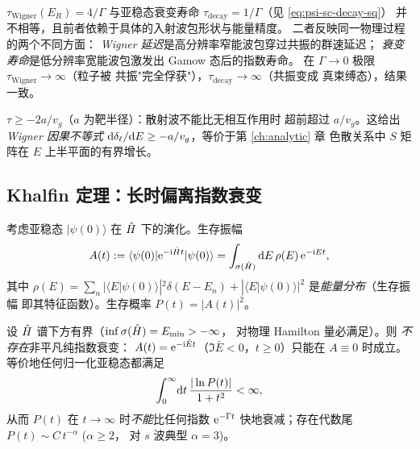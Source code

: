 \begin{remark}[与衰变寿命的关系]
  $\tau_{\mathrm{Wigner}}(E_R)=4/\Gamma$ 与亚稳态衰变寿命
  $\tau_{\mathrm{decay}}=1/\Gamma$（见 \eqref{eq:psi-sc-decay-sq}）
  并不相等，且前者依赖于具体的入射波包形状与能量精度。
  二者反映同一物理过程的两个不同方面：
  \emph{Wigner 延迟}是高分辨率窄能波包穿过共振的群速延迟；
  \emph{衰变寿命}是低分辨率宽能波包激发出 Gamow 态后的指数寿命。
  在 $\Gamma\to 0$ 极限 $\tau_{\mathrm{Wigner}}\to\infty$（粒子被
  共振"完全俘获"），$\tau_{\mathrm{decay}}\to\infty$（共振变成
  真束缚态），结果一致。
\end{remark}

\begin{remark}[因果性下界]
  $\tau\geq -2a/v_g$（$a$ 为靶半径）：散射波不能比无相互作用时
  超前超过 $a/v_g$。这给出 \emph{Wigner 因果不等式}
  $\mathrm{d}\delta_\ell/\mathrm{d} E\geq -a/v_g$，等价于第 \ref{ch:analytic} 章
  色散关系中 $S$ 矩阵在 $E$ 上半平面的有界增长。
\end{remark}

\subsection{Khalfin 定理：长时偏离指数衰变}\label{subsec:res-Khalfin}

考虑亚稳态 $|\psi(0)\rangle$ 在 $\hat{H}$ 下的演化。生存振幅
\begin{equation}\label{eq:res-survival-def}
  A(t):=\langle\psi(0)|\mathrm{e}^{-\mathrm{i}\hat{H} t}|\psi(0)\rangle
       =\int_{\sigma(\hat{H})}\mathrm{d} E\,\rho(E)\,\mathrm{e}^{-\mathrm{i} E t},
\end{equation}
其中 $\rho(E)=\sum_n|\langle E|\psi(0)\rangle|^2 \delta(E-E_n)
+|\langle E|\psi(0)\rangle|^2$ 是\emph{能量分布}（生存振幅
即其特征函数）。生存概率 $P(t)=|A(t)|^2$。

\begin{theorem}[Khalfin]\label{thm:res-Khalfin}
  设 $\hat{H}$ 谱下方有界（$\inf\sigma(\hat{H})=E_{\min}>-\infty$，
  对物理 Hamilton 量必满足）。则
  \emph{不存在}非平凡纯指数衰变：
  $A(t)=\mathrm{e}^{-\mathrm{i}\bar E t}$（$\Im\bar E<0$，$t\geq 0$）只能在
  $A\equiv 0$ 时成立。等价地任何归一化亚稳态都满足
  \begin{equation}\label{eq:res-Khalfin-bound}
    \int_0^\infty\!\mathrm{d} t\,\frac{|\ln P(t)|}{1+t^2}<\infty,
  \end{equation}
  从而 $P(t)$ 在 $t\to\infty$ 时\emph{不能}比任何指数 $\mathrm{e}^{-\Gamma t}$
  快地衰减；存在代数尾 $P(t)\sim C\,t^{-\alpha}$ ($\alpha\geq 2$，
  对 $s$ 波典型 $\alpha=3$)。
\end{theorem}


